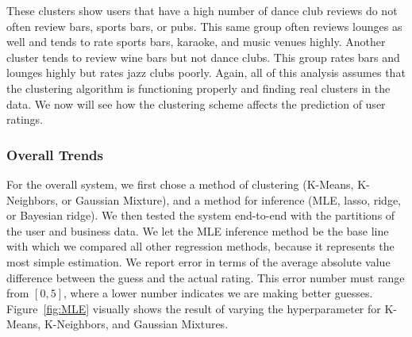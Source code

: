 \documentclass[11pt]{article}
\begin{document}
These clusters show users that have a high number of dance club reviews do not often review bars, sports bars, or pubs. This same group often reviews lounges as well and tends to rate sports bars, karaoke, and music venues highly. Another cluster tends to review wine bars but not dance clubs. This group rates bars and lounges highly but rates jazz clubs poorly. Again, all of this analysis assumes that the clustering algorithm is functioning properly and finding real clusters in the data. We now will see how the clustering scheme affects the prediction of user ratings.

\subsubsection{Overall Trends}
For the overall system, we first chose a method of clustering (K-Means, K-Neighbors, or Gaussian Mixture), and a method for inference (MLE, lasso, ridge, or Bayesian ridge). We then tested the system end-to-end with the partitions of the user and business data. We let the MLE inference method be the base line with which we compared all other regression methods, because it represents the most simple estimation. We report error in terms of the average absolute value difference between the guess and the actual rating. This error number must range from $[0, 5]$, where a lower number indicates we are making better guesses. Figure~\ref{fig:MLE} visually shows the result of varying the hyperparameter for K-Means, K-Neighbors, and Gaussian Mixtures.
\end{document}
